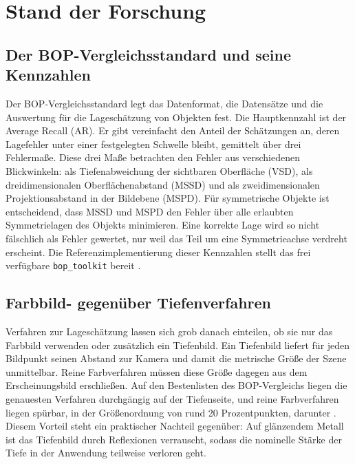 \documentclass[oneside,studentpaper]{wbk}
\begin{document}
\chapter{Stand der Forschung}
\label{ch:stand}

\section{Der BOP-Vergleichsstandard und seine Kennzahlen}

Der BOP-Vergleichsstandard \cite{bop2024} legt das Datenformat, die Datensätze
und die Auswertung für die Lageschätzung von Objekten fest. Die Hauptkennzahl ist
der Average Recall (AR). Er gibt vereinfacht den Anteil der Schätzungen an, deren
Lagefehler unter einer festgelegten Schwelle bleibt, gemittelt über drei
Fehlermaße. Diese drei Maße betrachten den Fehler aus verschiedenen Blickwinkeln:
als Tiefenabweichung der sichtbaren Oberfläche (VSD), als dreidimensionalen
Oberflächenabstand (MSSD) und als zweidimensionalen Projektionsabstand in der
Bildebene (MSPD). Für symmetrische Objekte ist entscheidend, dass MSSD und MSPD
den Fehler über alle erlaubten Symmetrielagen des Objekts minimieren. Eine
korrekte Lage wird so nicht fälschlich als Fehler gewertet, nur weil das Teil um
eine Symmetrieachse verdreht erscheint. Die Referenzimplementierung dieser
Kennzahlen stellt das frei verfügbare \texttt{bop\_toolkit} bereit
\cite{boptoolkit}.

\section{Farbbild- gegenüber Tiefenverfahren}

Verfahren zur Lageschätzung lassen sich grob danach einteilen, ob sie nur das
Farbbild verwenden oder zusätzlich ein Tiefenbild. Ein Tiefenbild liefert für
jeden Bildpunkt seinen Abstand zur Kamera und damit die metrische Größe der Szene
unmittelbar. Reine Farbverfahren müssen diese Größe dagegen aus dem Erscheinungsbild
erschließen. Auf den Bestenlisten des BOP-Vergleichs liegen die genauesten
Verfahren durchgängig auf der Tiefenseite, und reine Farbverfahren liegen
spürbar, in der Größenordnung von rund 20 Prozentpunkten, darunter
\cite{bop2024}. Diesem Vorteil steht ein praktischer Nachteil gegenüber: Auf
glänzendem Metall ist das Tiefenbild durch Reflexionen verrauscht, sodass die
nominelle Stärke der Tiefe in der Anwendung teilweise verloren geht.
\end{document}
